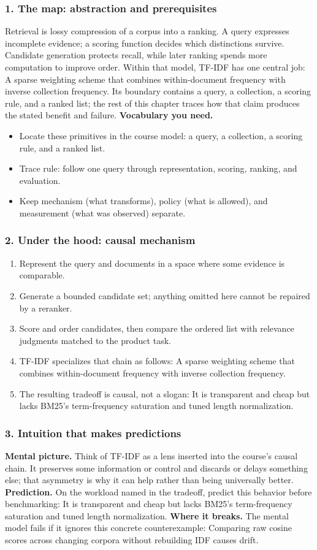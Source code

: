 \subsubsection*{1. The map: abstraction and prerequisites}
Retrieval is lossy compression of a corpus into a ranking. A query expresses incomplete evidence; a scoring function decides which distinctions survive. Candidate generation protects recall, while later ranking spends more computation to improve order.
Within that model, TF-IDF has one central job: A sparse weighting scheme that combines within-document frequency with inverse collection frequency. Its boundary contains a query, a collection, a scoring rule, and a ranked list; the rest of this chapter traces how that claim produces the stated benefit and failure.
\textbf{Vocabulary you need.}\begin{itemize}
\item Locate these primitives in the course model: a query, a collection, a scoring rule, and a ranked list.
\item Trace rule: follow one query through representation, scoring, ranking, and evaluation.
\item Keep mechanism (what transforms), policy (what is allowed), and measurement (what was observed) separate.
\end{itemize}
\subsubsection*{2. Under the hood: causal mechanism}\begin{enumerate}
\item Represent the query and documents in a space where some evidence is comparable.
\item Generate a bounded candidate set; anything omitted here cannot be repaired by a reranker.
\item Score and order candidates, then compare the ordered list with relevance judgments matched to the product task.
\item TF-IDF specializes that chain as follows: A sparse weighting scheme that combines within-document frequency with inverse collection frequency.
\item The resulting tradeoff is causal, not a slogan: It is transparent and cheap but lacks BM25's term-frequency saturation and tuned length normalization.
\end{enumerate}
\subsubsection*{3. Intuition that makes predictions}
\textbf{Mental picture.} Think of TF-IDF as a lens inserted into the course's causal chain. It preserves some information or control and discards or delays something else; that asymmetry is why it can help rather than being universally better.
\textbf{Prediction.} On the workload named in the tradeoff, predict this behavior before benchmarking: It is transparent and cheap but lacks BM25's term-frequency saturation and tuned length normalization.
\textbf{Where it breaks.} The mental model fails if it ignores this concrete counterexample: Comparing raw cosine scores across changing corpora without rebuilding IDF causes drift.

